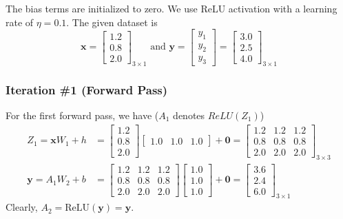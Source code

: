 \documentclass[12pt]{article}
\begin{document}
    The bias terms are initialized to zero. We use ReLU activation with a learning rate of $\eta = 0.1$.
    The given dataset is
    \begin{equation*}
        \mathbf{x} = \begin{bmatrix}
            1.2 \\ 0.8 \\ 2.0
        \end{bmatrix}_{3 \times 1} \text{ and } \mathbf{y} = \begin{bmatrix}
            y_{1} \\ y_{2} \\ y_{3}
        \end{bmatrix} = \begin{bmatrix}
            3.0 \\ 2.5 \\ 4.0
        \end{bmatrix}_{3 \times 1}
    \end{equation*}

    \subsubsection*{Iteration \#1 (Forward Pass)}
    For the first forward pass, we have ($A_{1}$ denotes $ReLU(Z_{1})$)
    \begin{align}
        Z_{1} = \mathbf{x} W_{1} + h &= \begin{bmatrix}
            1.2 \\ 0.8 \\ 2.0
        \end{bmatrix} \begin{bmatrix}
            1.0 & 1.0 & 1.0
        \end{bmatrix} + \mathbf{0} = \begin{bmatrix}
            1.2 & 1.2 & 1.2 \\
            0.8 & 0.8 & 0.8 \\
            2.0 & 2.0 & 2.0
        \end{bmatrix}_{3 \times 3}\\
        \mathbf{y} = A_{1} W_{2} + b &= \begin{bmatrix}
            1.2 & 1.2 & 1.2 \\
            0.8 & 0.8 & 0.8 \\
            2.0 & 2.0 & 2.0
        \end{bmatrix} \begin{bmatrix}
            1.0 \\ 1.0 \\ 1.0
        \end{bmatrix} + \mathbf{0} = \begin{bmatrix}
            3.6 \\ 2.4 \\ 6.0
        \end{bmatrix}_{3 \times 1}
    \end{align}
    Clearly, $A_{2} = \text{ReLU}(\mathbf{y}) = \mathbf{y}$.
\end{document}
